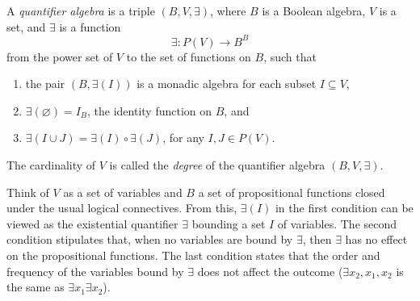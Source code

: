 \documentclass[12pt]{article}
\begin{document}

A \emph{quantifier algebra} is a triple $(B,V,\exists)$, where $B$ is a Boolean algebra, $V$ is a set, and $\exists$ is a function $$\exists: P(V)\to B^B$$
from the power set of $V$ to the set of functions on $B$, such that
\begin{enumerate}
\item the pair $(B,\exists(I))$ is a monadic algebra for each subset $I\subseteq V$, 
\item $\exists(\varnothing)=I_B$, the identity function on $B$, and
\item $\exists(I\cup J)=\exists(I)\circ \exists(J)$, for any $I,J\in P(V)$.
\end{enumerate}
The cardinality of $V$ is called the \emph{degree} of the quantifier algebra $(B,V,\exists)$.


Think of $V$ as a set of variables and $B$ a set of propositional functions closed under the usual logical connectives.  From this, $\exists(I)$ in the first condition can be viewed as the existential quantifier $\exists$ bounding a set $I$ of variables.  The second condition stipulates that, when no variables are bound by $\exists$, then $\exists$ has no effect on the propositional functions.  The last condition states that the order and frequency of the variables bound by $\exists$ does not affect the outcome ($\exists x_2, x_1, x_2$ is the same as $\exists x_1 \exists x_2$).
\end{document}
